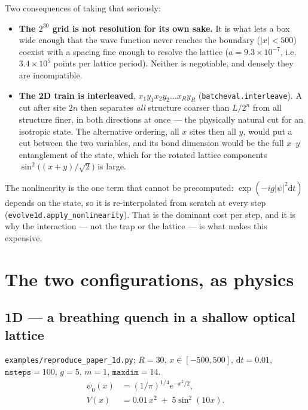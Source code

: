 \documentclass[11pt,a4paper]{article}
\newcommand{\code}[1]{\texttt{#1}}
\newcommand{\dd}{\mathrm{d}}
\begin{document}
Two consequences of taking that seriously:

\begin{itemize}[leftmargin=1.2em]
\item \textbf{The $2^{30}$ grid is not resolution for its own sake.} It is what lets a
  box wide enough that the wave function never reaches the boundary ($|x| < 500$)
  coexist with a spacing fine enough to resolve the lattice
  ($a = 9.3\times10^{-7}$, i.e.\ $3.4\times10^5$ points per lattice period). Neither
  is negotiable, and densely they are incompatible.
\item \textbf{The 2D train is interleaved}, $x_1 y_1 x_2 y_2 \dots x_R y_R$
  (\code{batcheval.interleave}). A cut after site $2n$ then separates \emph{all}
  structure coarser than $L/2^n$ from all structure finer, in both directions at once
  --- the physically natural cut for an isotropic state. The alternative ordering,
  all $x$ sites then all $y$, would put a cut between the two variables, and its bond
  dimension would be the full $x$--$y$ entanglement of the state, which for the
  rotated lattice components $\sin^2\!\big((x+y)/\sqrt{2}\big)$ is large.
\end{itemize}

The nonlinearity is the one term that cannot be precomputed:
$\exp(-i g |\psi|^2 \dd t)$ depends on the state, so it is re-interpolated from
scratch at every step (\code{evolve1d.apply\_nonlinearity}). That is the dominant cost
per step, and it is why the interaction --- not the trap or the lattice --- is what
makes this expensive.

\section{The two configurations, as physics}

\subsection{1D --- a breathing quench in a shallow optical lattice}

\code{examples/reproduce\_paper\_1d.py}; $R = 30$, $x \in [-500, 500]$,
$\dd t = 0.01$, $\code{nsteps} = 100$, $g = 5$, $m = 1$, $\code{maxdim} = 14$.
\begin{align}
  \psi_0(x) &= (1/\pi)^{1/4} e^{-x^2/2}, \\
  V(x)      &= 0.01\,x^2 \;+\; 5\sin^2(10x).
\end{align}
\end{document}
